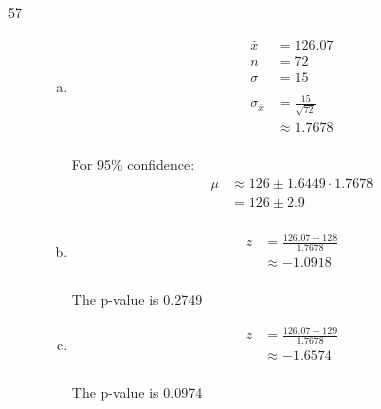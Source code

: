 \documentclass[letterpaper, landscape]{exam}
\begin{document}
\begin{description}
      \item[57]
        \begin{enumerate}[(a)]
          \item 
            \begin{align*}
              \bar{x} & = 126.07 \\
              n       & = 72 \\
              \sigma  & = 15 \\
              \\
              \sigma_{\bar{x}} & = \frac{15}{\sqrt{72}} \\
                               & \approx 1.7678 \\
            \end{align*}

            For 95\% confidence:
            \begin{align*}
              \mu & \approx 126 \pm 1.6449 \cdot 1.7678 \\
                  & = 126 \pm 2.9 \\
            \end{align*}


          \item 
            \begin{align*}
              z & = \frac{126.07 - 128}{1.7678} \\
                & \approx -1.0918 \\
            \end{align*}

            The p-value is 0.2749

          \item 
            \begin{align*}
              z & = \frac{126.07 - 129}{1.7678} \\
                & \approx -1.6574 \\
            \end{align*}

            The p-value is 0.0974 

        \end{enumerate}

  \end{description}
\end{document}
